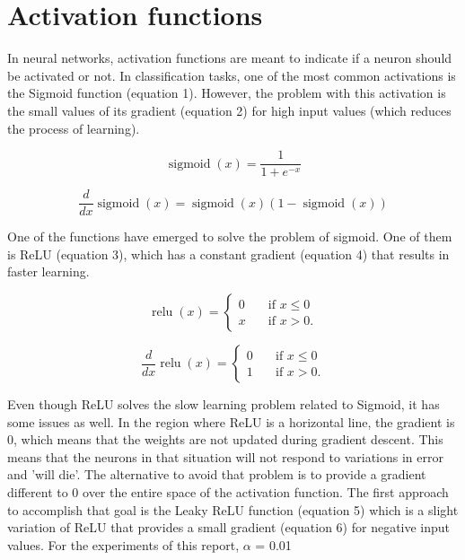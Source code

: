 \documentclass{article}
\DeclareMathOperator{\sigmoid}{sigmoid}
\DeclareMathOperator{\relu}{relu}
\begin{document}
\section{Activation functions}
\label{sec:actfn}
In neural networks, activation functions are meant to indicate if a neuron should be activated or not. In classification tasks, one of the most common activations is the Sigmoid function (equation 1). However, the problem with this activation is the small values of its gradient (equation 2) for high input values (which reduces the process of learning).

\begin{equation}
  \sigmoid(x) = \frac{1}{1 + e^{-x}}
\end{equation} 

\begin{equation}
  \frac{d}{dx} \sigmoid(x) = \sigmoid(x)(1 - \sigmoid(x))
\end{equation} 


One of the functions have emerged to solve the problem of sigmoid. One of them is ReLU (equation 3), which has a constant gradient (equation 4) that results in faster learning.

\begin{equation}
  \relu(x) =
     \begin{cases} 
      0      & \quad \text{if } x \leq  0 \\
      x       & \quad \text{if } x > 0 .
    \end{cases} 
\end{equation}

\begin{equation}
  \frac{d}{dx} \relu(x) =
     \begin{cases} 
      0      & \quad \text{if } x \leq  0 \\
      1       & \quad \text{if } x > 0 .
    \end{cases} 
\end{equation}

Even though ReLU solves the slow learning problem related to Sigmoid, it has some issues as well. In the region where ReLU is a horizontal line, the gradient is 0, which means that the weights are not updated during gradient descent. This means that the neurons in that situation will not respond to variations in error and 'will die'. The alternative to avoid that problem is to provide a gradient different to 0 over the entire space of the activation function. The first approach to accomplish that goal is the Leaky ReLU function (equation 5) which is a slight variation of ReLU that provides a small gradient (equation 6) for negative input values. For the experiments of this report, \(\alpha\) = 0.01
\end{document}
